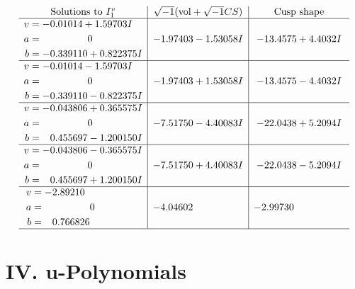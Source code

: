 \documentclass[1p]{elsarticle_modified}
\theoremstyle{definition}
\newcommand{\I}{\sqrt{-1}}
\begin{document}
$$\begin{array}{c|c|c}  
\text{Solutions to }I^v_{1}& \I (\text{vol} + \sqrt{-1}CS) & \text{Cusp shape}\\
 \hline 
\begin{aligned}
v &= -0.01014 + 1.59703 I \\
a &= \phantom{-0.000000 } 0 \\
b &= -0.339110 + 0.822375 I\end{aligned}
 & -1.97403 - 1.53058 I & -13.4575 + 4.4032 I \\ \hline\begin{aligned}
v &= -0.01014 - 1.59703 I \\
a &= \phantom{-0.000000 } 0 \\
b &= -0.339110 - 0.822375 I\end{aligned}
 & -1.97403 + 1.53058 I & -13.4575 - 4.4032 I \\ \hline\begin{aligned}
v &= -0.043806 + 0.365575 I \\
a &= \phantom{-0.000000 } 0 \\
b &= \phantom{-}0.455697 - 1.200150 I\end{aligned}
 & -7.51750 - 4.40083 I & -22.0438 + 5.2094 I \\ \hline\begin{aligned}
v &= -0.043806 - 0.365575 I \\
a &= \phantom{-0.000000 } 0 \\
b &= \phantom{-}0.455697 + 1.200150 I\end{aligned}
 & -7.51750 + 4.40083 I & -22.0438 - 5.2094 I \\ \hline\begin{aligned}
v &= -2.89210\phantom{ +0.000000I} \\
a &= \phantom{-0.000000 } 0 \\
b &= \phantom{-}0.766826\phantom{ +0.000000I}\end{aligned}
 & -4.04602\phantom{ +0.000000I} & -2.99730\phantom{ +0.000000I}\\
 \hline 
 \end{array}$$\newpage
\newpage\renewcommand{\arraystretch}{1}
\centering \section*{ IV. u-Polynomials}
\end{document}
